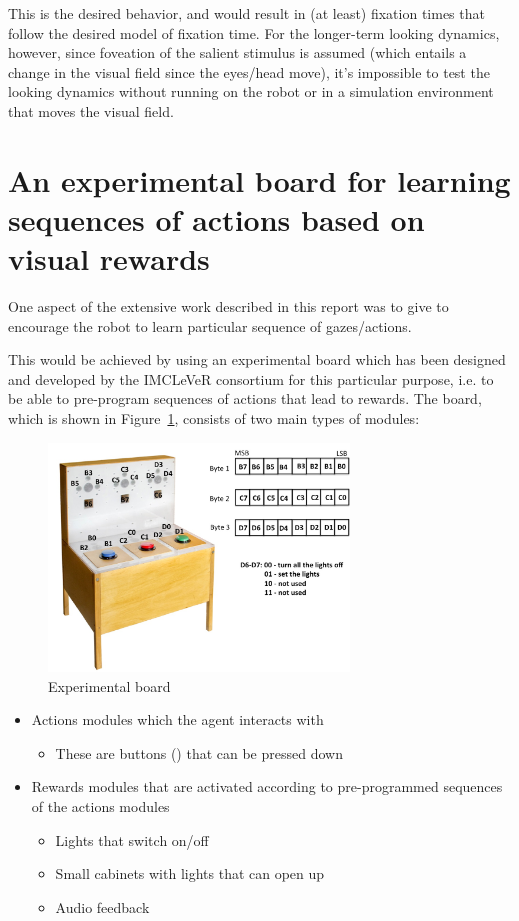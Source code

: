 \documentclass[conference]{IEEEtran}
\begin{document}
This is the desired behavior, and would result in (at least) fixation
times that follow the desired model of fixation time. For the
longer-term looking dynamics, however, since foveation of the salient
stimulus is assumed (which entails a change in the visual field since
the eyes/head move), it's impossible to test the looking dynamics
without running on the robot or in a simulation environment that moves
the visual field.

\section{An experimental board for learning sequences of actions based on visual rewards}
\label{sec:serial_experimental_board}

One aspect of the extensive work described in this report was to give
to encourage the robot to learn particular sequence of gazes/actions.

This would be achieved by using an experimental board which has been
designed and developed by the IMCLeVeR consortium for this particular
purpose, i.e. to be able to pre-program sequences of actions that lead
to rewards. The board, which is shown in
Figure~\ref{fig:experimental_board}, consists of two main types of
modules:

\begin{figure}[htb]
\begin{center}
\includegraphics[width=8cm]{lights.jpg}
\end{center}
\caption{Experimental board}
\label{fig:experimental_board}
\end{figure}


\begin{itemize}
\item Actions modules which the agent interacts with
\begin{itemize}
\item These are buttons () that can be pressed down
\end{itemize}
\item Rewards modules that are activated according to pre-programmed
  sequences of the actions modules
\begin{itemize}
\item Lights that switch on/off
\item Small cabinets with lights that can open up
\item Audio feedback
\end{itemize}
\end{itemize}
\end{document}
